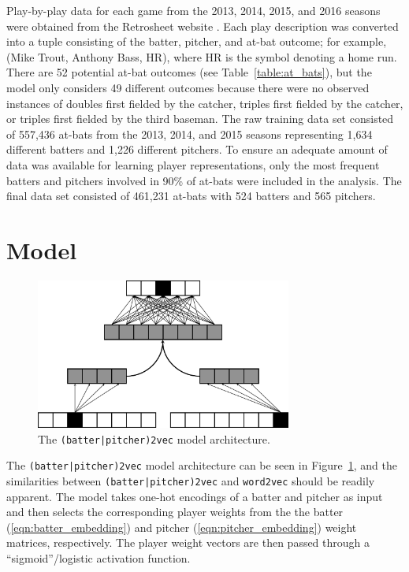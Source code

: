\documentclass{article}
\begin{document}
Play-by-play data for each game from the 2013, 2014, 2015, and 2016 seasons were obtained from the Retrosheet website \parencite{Retro}. Each play description was converted into a tuple consisting of the batter, pitcher, and at-bat outcome; for example, (Mike Trout, Anthony Bass, HR), where HR is the symbol denoting a home run. There are 52 potential at-bat outcomes (see Table~\ref{table:at_bats}), but the model only considers 49 different outcomes because there were no observed instances of doubles first fielded by the catcher, triples first fielded by the catcher, or triples first fielded by the third baseman. The raw training data set consisted of 557,436 at-bats from the 2013, 2014, and 2015 seasons representing 1,634 different batters and 1,226 different pitchers. To ensure an adequate amount of data was available for learning player representations, only the most frequent batters and pitchers involved in 90\% of at-bats were included in the analysis. The final data set consisted of 461,231 at-bats with 524 batters and 565 pitchers.

\section{Model}
\label{model}

\begin{figure}[h]
\centering
\includegraphics[width=0.75\textwidth,height=\textheight,keepaspectratio]{batter_pitcher_model.png}
\caption{The \texttt{(batter|pitcher)2vec} model architecture.}
\label{fig:batter_pitcher}
\end{figure}

The \texttt{(batter|pitcher)2vec} model architecture can be seen in Figure~\ref{fig:batter_pitcher}, and the similarities between \texttt{(batter|pitcher)2vec} and \texttt{word2vec} should be readily apparent. The model takes one-hot encodings of a batter and pitcher as input and then selects the corresponding player weights from the the batter (\ref{eqn:batter_embedding}) and pitcher (\ref{eqn:pitcher_embedding}) weight matrices, respectively. The player weight vectors are then passed through a ``sigmoid''/logistic activation function.
\end{document}

